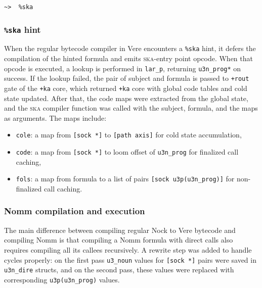 \documentclass[twoside]{article}
\begin{document}
\begin{lstlisting}[style=listingblock]
~>  %ska
\end{lstlisting}


\subsubsection{\texttt{\%ska} hint}

When the regular bytecode compiler in Vere encounters a \lstinline[style=inlinecode]{%ska} hint, it defers the compilation of the hinted formula and emits \textsc{ska}-entry point opcode.  When that opcode is executed, a lookup is performed in \lstinline[style=inlinecode]{lar_p}, returning \lstinline[style=inlinecode]{u3n_prog*} on success.  If the lookup failed, the pair of subject and formula is passed to \lstinline[style=inlinecode]{+rout} gate of the \lstinline[style=inlinecode]{+ka} core, which returned \lstinline[style=inlinecode]{+ka} core with global code tables and cold state updated.  After that, the code maps were extracted from the global state, and the \textsc{ska} compiler function was called with the subject, formula, and the maps as arguments.  The maps include:

\begin{itemize}
  \item \lstinline[style=inlinecode]{cole}: a map from \lstinline[style=inlinecode]{[sock *]} to \lstinline[style=inlinecode]{[path axis]} for cold state accumulation,
  \item \lstinline[style=inlinecode]{code}: a map from \lstinline[style=inlinecode]{[sock *]} to loom offset of \lstinline[style=inlinecode]{u3n_prog} for finalized call caching,
  \item \lstinline[style=inlinecode]{fols}: a map from formula to a list of pairs \lstinline[style=inlinecode]{[sock u3p(u3n_prog)]} for non-finalized call caching.
\end{itemize}

\subsubsection{Nomm compilation and execution}

The main difference between compiling regular Nock to Vere bytecode and compiling Nomm is that compiling a Nomm formula with direct calls also requires compiling all its callees recursively.  A rewrite step was added to handle cycles properly: on the first pass \lstinline[style=inlinecode]{u3_noun} values for \lstinline[style=inlinecode]{[sock *]} pairs were saved in \lstinline[style=inlinecode]{u3n_dire} structs, and on the second pass, these values were replaced with corresponding \lstinline[style=inlinecode]{u3p(u3n_prog)} values.
\end{document}
